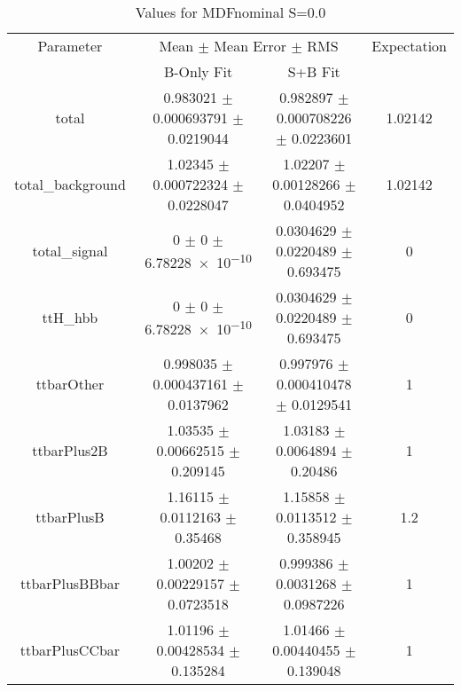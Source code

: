 \begin{table}
\centering
\caption{Values for MDFnominal S=0.0}
\begin{tabular}{cccc}
\toprule
Parameter & \multicolumn{2}{c}{Mean $\pm$ Mean Error $\pm$ RMS} & Expectation\\
 & B-Only Fit & S+B Fit & \\
\midrule
total & \num{0.983021} $\pm$ \num{0.000693791} $\pm$ \num{0.0219044} & \num{0.982897} $\pm$ \num{0.000708226} $\pm$ \num{0.0223601} & \num{1.02142}\\
total\_background & \num{1.02345} $\pm$ \num{0.000722324} $\pm$ \num{0.0228047} & \num{1.02207} $\pm$ \num{0.00128266} $\pm$ \num{0.0404952} & \num{1.02142}\\
total\_signal & \num{0} $\pm$ \num{0} $\pm$ \num{6.78228e-10} & \num{0.0304629} $\pm$ \num{0.0220489} $\pm$ \num{0.693475} & \num{0}\\
ttH\_hbb & \num{0} $\pm$ \num{0} $\pm$ \num{6.78228e-10} & \num{0.0304629} $\pm$ \num{0.0220489} $\pm$ \num{0.693475} & \num{0}\\
ttbarOther & \num{0.998035} $\pm$ \num{0.000437161} $\pm$ \num{0.0137962} & \num{0.997976} $\pm$ \num{0.000410478} $\pm$ \num{0.0129541} & \num{1}\\
ttbarPlus2B & \num{1.03535} $\pm$ \num{0.00662515} $\pm$ \num{0.209145} & \num{1.03183} $\pm$ \num{0.0064894} $\pm$ \num{0.20486} & \num{1}\\
ttbarPlusB & \num{1.16115} $\pm$ \num{0.0112163} $\pm$ \num{0.35468} & \num{1.15858} $\pm$ \num{0.0113512} $\pm$ \num{0.358945} & \num{1.2}\\
ttbarPlusBBbar & \num{1.00202} $\pm$ \num{0.00229157} $\pm$ \num{0.0723518} & \num{0.999386} $\pm$ \num{0.0031268} $\pm$ \num{0.0987226} & \num{1}\\
ttbarPlusCCbar & \num{1.01196} $\pm$ \num{0.00428534} $\pm$ \num{0.135284} & \num{1.01466} $\pm$ \num{0.00440455} $\pm$ \num{0.139048} & \num{1}\\
\bottomrule
\end{tabular}
\end{table}